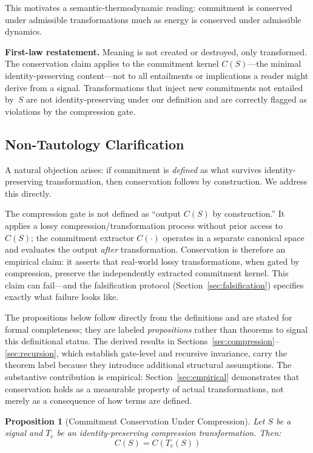 \documentclass[11pt,a4paper]{article}
\newtheorem{proposition}[theorem]{Proposition}
\begin{document}
\noindent This motivates a semantic-thermodynamic reading: commitment is conserved under admissible transformations much as energy is conserved under admissible dynamics.

\noindent\textbf{First-law restatement.} Meaning is not created or destroyed, only transformed. The conservation claim applies to the commitment kernel $C(S)$---the minimal identity-preserving content---not to all entailments or implications a reader might derive from a signal. Transformations that inject new commitments not entailed by~$S$ are not identity-preserving under our definition and are correctly flagged as violations by the compression gate.

\subsection{Non-Tautology Clarification}
\label{sec:non-tautology}

A natural objection arises: if commitment is \emph{defined} as what survives identity-preserving transformation, then conservation follows by construction. We address this directly.

The compression gate is not defined as ``output $C(S)$ by construction.'' It applies a lossy compression/transformation process without prior access to $C(S)$; the commitment extractor $C(\cdot)$ operates in a separate canonical space and evaluates the output \emph{after} transformation. Conservation is therefore an empirical claim: it asserts that real-world lossy transformations, when gated by compression, preserve the independently extracted commitment kernel. This claim can fail---and the falsification protocol (Section~\ref{sec:falsification}) specifies exactly what failure looks like.

The propositions below follow directly from the definitions and are stated for formal completeness; they are labeled \emph{propositions} rather than theorems to signal this definitional status. The derived results in Sections~\ref{sec:compression}--\ref{sec:recursion}, which establish gate-level and recursive invariance, carry the theorem label because they introduce additional structural assumptions. The substantive contribution is empirical: Section~\ref{sec:empirical} demonstrates that conservation holds as a measurable property of actual transformations, not merely as a consequence of how terms are defined.

\begin{proposition}[Commitment Conservation Under Compression]
\label{prop:compression}
Let $S$ be a signal and $T_c$ be an identity-preserving compression transformation. Then:
\begin{equation}
C(S) = C(T_c(S))
\end{equation}
\end{proposition}
\end{document}
